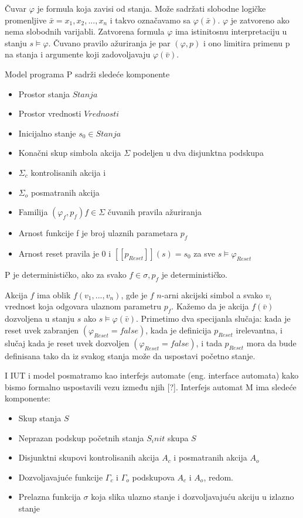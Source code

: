 \documentclass[a4paper]{article}
\theoremstyle{definition}
\begin{document}
{Čuvar $\varphi$ je formula koja zavisi od stanja. Može sadržati slobodne logičke promenljive $\bar{x} = x_1, x_2,..., x_n$ i takvo označavamo sa $\varphi(\bar{x})$. $\varphi$ je zatvoreno ako nema slobodnih varijabli. Zatvorena formula $\varphi$ ima istinitosnu interpretaciju u stanju $s \models \varphi$. Čuvano pravilo ažuriranja je par $(\varphi, p)$ i ono limitira primenu p na stanja i argumente koji zadovoljavaju $\varphi(\bar{v})$.


Model programa P sadrži sledeće komponente
\begin{itemize}
\item Prostor stanja $Stanja$
\item Prostor vrednosti $Vrednosti$
\item Inicijalno stanje $s_0 \in Stanja$
\item Konačni skup simbola akcija $\Sigma$ podeljen u dva disjunktna podskupa
	\item $\Sigma_c$ kontrolisanih akcija i
	\item $\Sigma_o$ posmatranih akcija
\item Familija $(\varphi_f, p_f) f \in \Sigma$ čuvanih pravila ažuriranja
	\item Arnost funkcije f je broj ulaznih parametara $p_f$
	\item Arnost reset pravila je 0 i $[[p_{Reset}]](s) = s_0$ za sve $s \models \varphi_{Reset}$
\end{itemize}
P je determinističko, ako za svako $f \in \sigma, p_f$ je determinističko.


Akcija $f$ ima oblik $f(v_1,...,v_n)$, gde je $f$ $n$-arni akcijski simbol a svako $v_i$ vrednost koja odgovara ulaznom parametru $p_f$. Kažemo da je akcija $f(\bar{v})$ dozvoljena u stanju $s$ ako $s \models \varphi(\bar{v})$. Primetimo dva specijanla slučaja: kada je reset uvek zabranjen $(\varphi_{Reset} = false)$, kada je definicija $p_{Reset}$ irelevantna, i slučaj kada je reset uvek dozvoljen $(\varphi_{Reset} = false)$, i tada $p_{Reset}$ mora da bude definisana tako da iz svakog stanja može da uspostavi početno stanje.

I IUT i model posmatramo kao interfejs automate (eng. interface automata) kako bismo formalno uspostavili vezu između njih [?]. %
Interfejs automat M ima sledeće komponente:
\begin{itemize}
\item Skup stanja $S$
\item Neprazan podskup početnih stanja $S_init$ skupa $S$
\item Disjunktni skupovi kontrolisanih akcija $A_c$ i posmatranih akcija $A_o$
\item Dozvoljavajuće funkcije $\Gamma_c$ i $\Gamma_o$ podskupova $A_c$ i $A_o$, redom.
\item Prelazna funkcija $\sigma$ koja slika ulazno stanje i dozvoljavajuću akciju u izlazno stanje
\end{itemize}

}
\end{document}

